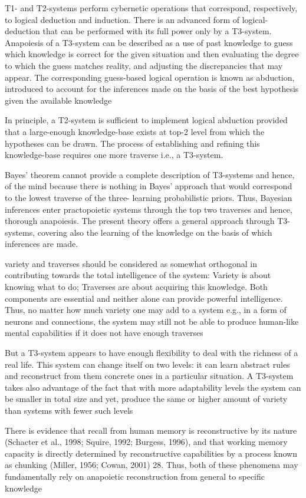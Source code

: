 \documentclass[10pt,a4paper]{article}
\begin{document}
T1- and T2-systems perform cybernetic operations that correspond,
respectively, to logical deduction and induction. There is an
advanced form of logical-deduction that can be performed with its
full power only by a T3-system. Anapoiesis of a T3-system can be
described as a use of past knowledge to guess which knowledge is
correct for the given situation and then evaluating the degree to
which the guess matches reality, and adjusting the discrepancies
that may appear. The corresponding guess-based logical operation
is known as abduction, introduced to account for the inferences
made on the basis of the best hypothesis given the available
knowledge


In principle, a T2-system is sufficient to implement logical
abduction provided that a large-enough knowledge-base exists at
top-2 level from which the hypotheses can be drawn. The process
of establishing and refining this knowledge-base requires one
more traverse i.e., a T3-system.

Bayes’
theorem cannot provide a complete description of T3-systems and
hence, of the mind because there is nothing in Bayes’ approach that would correspond to the lowest traverse of the three-
learning probabilistic priors. Thus, Bayesian inferences enter
practopoietic systems through the top two traverses and hence,
thorough anapoiesis. The present theory offers a general approach
through T3-systems, covering also the learning of the knowledge
on the basis of which inferences are made.


variety and traverses should be considered as
somewhat orthogonal in contributing towards the total intelligence
of the system: Variety is about knowing what to do;
Traverses are about acquiring this knowledge. Both components
are essential and neither alone can provide powerful intelligence.
Thus, no matter how much variety one may add to a system e.g., in
a form of neurons and connections, the system may still not be
able to produce human-like mental capabilities if it does not have
enough traverses


 But a T3-system appears to have
enough flexibility to deal with the richness of a real life. This
system can change itself on two levels: it can learn abstract rules
and reconstruct from them concrete ones in a particular situation.
A T3-system takes also advantage of the fact that with more
adaptability levels the system can be smaller in total size and
yet, produce the same or higher amount of variety than systems
with fewer such levels

There is evidence that recall from human memory is reconstructive
by its nature (Schacter et al., 1998; Squire, 1992; Burgess,
1996), and that working memory capacity is directly determined
by reconstructive capabilities by a process known as chunking
(Miller, 1956; Cowan, 2001)
28. Thus, both of these phenomena may
fundamentally rely on anapoietic reconstruction from general to
specific knowledge
\end{document}
